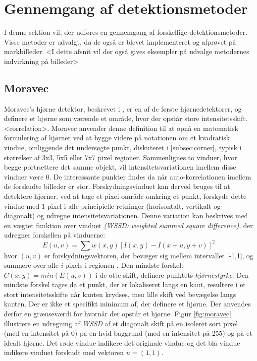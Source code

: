 \chapter{Gennemgang af detektionsmetoder}\label{sec:detmet}
I denne sektion vil, der udføres en gennemgang af forskellige detektionsmetoder. Visse metoder er udvalgt, da de også er blevet implementeret og afprøvet på markbilleder. <I dette afsnit vil der også gives eksempler på udvalge metodernes indvirkning på billeder> 

\section{Moravec}\label{sec:moravec}
Moravec's hjørne detektor, beskrevet i \cite{moravec}, er en af de første hjørnedetektorer, og definere et hjørne som værende et område, hvor der opstår store intensitetsskift. <correlation>. Moravec anvender denne definition til at opnå en matematisk formulering af hjørner ved at bygge videre på notationen om et kvadratisk vindue, omliggende det undersøgte punkt, diskuteret i \ref{subsec:corner}, typisk i størrelser af 3x3, 5x5 eller 7x7 pixel regioner. Sammenlignes to vinduer, hvor begge portrættere det samme objekt, vil intensitetsvariationen imellem disse vinduer være 0.
De interessante punkter findes da når auto-korrelationen imellem de forskudte billeder er stor. Forskydningsvinduet kan derved bruges til at detektere hjørner, ved at tage et pixel område omkring et punkt, forskyde dette vindue med 1 pixel i alle principielle retninger (horisontalt, vertikalt og diagonalt) og udregne intensitetsvariationen. Denne variation kan beskrives med en vægtet funktion over vinduet  \emph{(WSSD: weighted summed square difference)}, der udregner forskellen på vinduerne:
\begin{equation}
E(u,v)= \sum w(x,y)[I(x,y)-I(x+u,y+v)]^2     
\end{equation}
hvor $(u,v)$ er forskydningsvektoren, der bevæger sig mellem intervallet [-1,1], og summere over alle \textit{i} pixels i regionen . Den mindste forskel: $C(x,y)=min(E(u,v))$ i de otte skift, definere punktets \textit{hjørnestyrke}. Den mindste forskel tages da et punkt, der er lokaliseret langs en kant, resultere i et stort intensitetsskifte når kanten krydses, men lille skift ved bevægelse langs kanten. Der er ikke et specifikt minimum af, der definere et hjørne. Der anvendes derfor en grænseværdi for hvornår der opstår et hjørne. Figur \ref{fig:moravec} illustrere en udregning af \textit{WSSD} af et diagonalt skift på en isoleret sort pixel (med en intensitet på 0) på en hvid baggrund (med en intensitet på 255) og på et idealt hjørne. Det røde vindue indikere det originale vindue og det blå vindue indikere  vinduet forskudt med vektoren $u = (1,1)$. 
